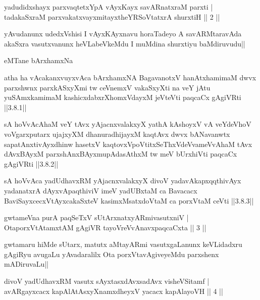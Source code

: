 \begin{shl}
yadudidxshayx parxvaqtetxYpA vAyxKayx savARnatxraM parxti |\\
tadakaSxraM parxvakatxvayxmitayxtheYRSoVtatxrA shurxtiH \hfill || 2 ||
\end{shl}

\begin{artha}
yAvudanunx udedxVshisi I vAyxKAyxnavu horaTadeyo A savARMtaravAda akaSxra vasutxvanunx heVLabeVkeMdu I muMdina shurxtiyu baMdiruvudu||
\end{artha}

\begin{center}
eMTane bArxhamxNa
\end{center}

\begin{shl}
atha ha vAcakanxvuyxvAca bArxhamxNA BagavanotxV hanAtxhamimaM dwvx parxshwnx parxkASxyXmi tw ceVnemxV vakaSxyXti na veY jAtu yuSAmxkamimaM kashicxdabxrXhomxVdayxM jeVteVti paqcaCx gAgiVRti ||3.8.1||
\end{shl}

\begin{shl}
sA hoVvAcAhaM veY tAvx yAjacnxvalakxyX yathA kAshoyxV vA veYdeVhoV voVgarxputarx ujajxyXM dhanuradhijayxM kaqtAvx dwvx bANavanwtx sapatAnxtivAyxdhinw hasetxV kaqtovxVpoVtitxSeThxVdeVvameVvAhaM tAvx dAvxBAyxM parxshAnxBAyxmupAdasAthxM tw meV bUrxhiVti paqcaCx gAgiVRti ||3.8.2||
\end{shl}

\begin{shl}
sA hoVvAca yadUdhavxRM yAjacnxvalakxyX divoV yadavAkapxqqthivAyx yadanatxrA dAyxvApaqthiviV imeV yadUBxtaM ca Bavacacx BaviSayxcecxVtAyxcakaSxteV kasimxMsatxdoVtaM ca porxVtaM ceVti ||3.8.3||
\end{shl}

\begin{shl}
gwtameVna purA paqSeTxV sUtArxnatxyARmivasutxniV |\\
OtaporxVtAtamxtAM gAgiVR tayoVreVvAnavxpaqcaCxta \hfill || 3 ||
\end{shl}

\begin{artha}%
gwtamaru hiMde sUtarx, matutx aMtayARmi vasutxgaLanunx keVLidadxru gAgiRyu avugaLu yAvadaralilx Ota porxVtavAgiveyeMdu parxshenx mADiruvaLu||
\end{artha}


\begin{shl}
divoV yadUdhavxRM vasutx sAyxtasxdAvx\s sadAvx visheVSitamf |\\
avARgayxcacx kapAlAtAsxyXnamxdheyxV yacacx kapAlayoVH \hfill || 4 ||
\end{shl}

